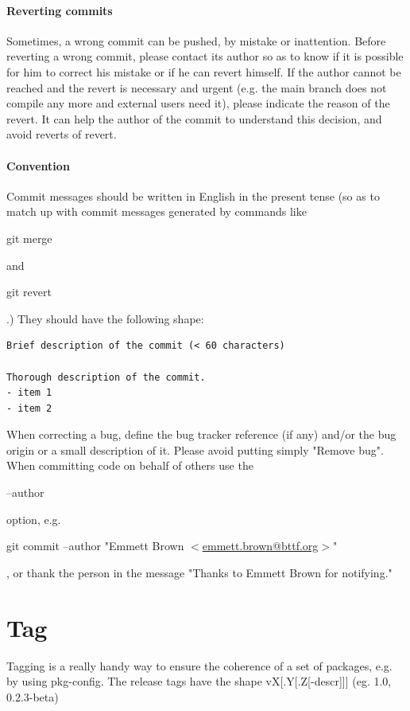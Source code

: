 \paragraph{Reverting commits}

Sometimes, a wrong commit can be pushed, by mistake or inattention.
Before reverting a wrong commit, please contact its author so as to know if it is possible for him to correct his mistake or if he can revert himself.
If the author cannot be reached and the revert is necessary and urgent (e.g. the main branch does not compile any more and external users need it), please indicate the reason of the revert. 
It can help the author of the commit to understand this decision, and avoid reverts of revert.

\paragraph{Convention}
Commit messages should be written in English in the present tense 
(so as to match up with commit messages generated by commands like \begin{tt}git merge\end{tt} and \begin{tt}git revert\end{tt}.)
They should have the following shape:
\begin{verbatim}
Brief description of the commit (< 60 characters)

Thorough description of the commit.
- item 1
- item 2
\end{verbatim}

When correcting a bug, define the bug tracker reference (if any) and/or the bug origin or a small description of it.
Please avoid putting simply "Remove bug".\\

When committing code on behalf of others use the \begin{tt}{--author}\end{tt} option, e.g. \begin{tt}git commit --author "Emmett Brown $<$\url{emmett.brown@bttf.org}$>$"\end{tt},
or thank the person in the message "Thanks to Emmett Brown for notifying."

\section{Tag}
Tagging is a really handy way to ensure the coherence of a set of packages, e.g. by using pkg-config.
The release tags have the shape vX[.Y[.Z[-descr]]] (eg. 1.0, 0.2.3-beta)


